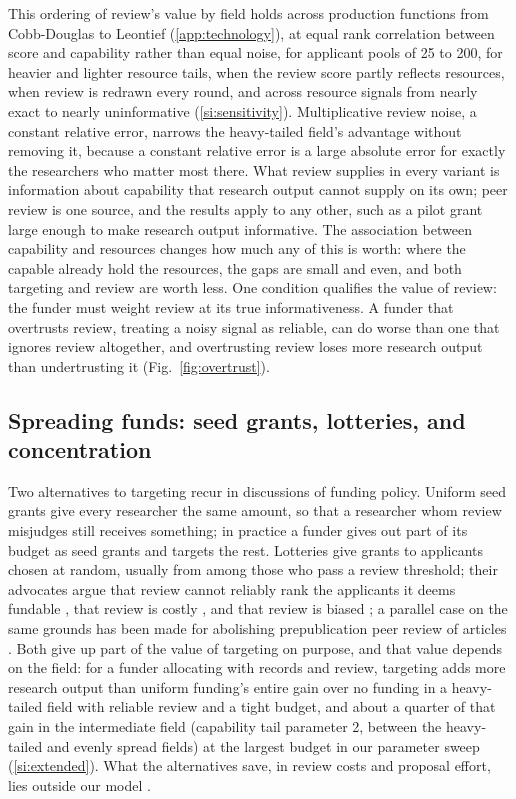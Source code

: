 \documentclass[article, 11pt, reqno]{amsart}
\theoremstyle{named}
\begin{document}
This ordering of review's value by field holds across production functions from Cobb-Douglas to Leontief (\ref{app:technology}), at equal rank correlation between score and capability rather than equal noise, for applicant pools of 25 to 200, for heavier and lighter resource tails, when the review score partly reflects resources, when review is redrawn every round, and across resource signals from nearly exact to nearly uninformative (\ref{si:sensitivity}). Multiplicative review noise, a constant relative error, narrows the heavy-tailed field's advantage without removing it, because a constant relative error is a large absolute error for exactly the researchers who matter most there. What review supplies in every variant is information about capability that research output cannot supply on its own; peer review is one source, and the results apply to any other, such as a pilot grant large enough to make research output informative. The association between capability and resources changes how much any of this is worth: where the capable already hold the resources, the gaps are small and even, and both targeting and review are worth less. One condition qualifies the value of review: the funder must weight review at its true informativeness. A funder that overtrusts review, treating a noisy signal as reliable, can do worse than one that ignores review altogether, and overtrusting review loses more research output than undertrusting it (Fig.~\ref{fig:overtrust}).



\subsection*{Spreading funds: seed grants, lotteries, and concentration}
Two alternatives to targeting recur in discussions of funding policy. Uniform seed grants give every researcher the same amount, so that a researcher whom review misjudges still receives something; in practice a funder gives out part of its budget as seed grants and targets the rest. Lotteries give grants to applicants chosen at random, usually from among those who pass a review threshold; their advocates argue that review cannot reliably rank the applicants it deems fundable \citep{Pier2018, Shaw2023}, that review is costly \citep{Herbert2013, GrossBergstrom2019}, and that review is biased \citep{Ginther2011, Witteman2019, Boudreau2016, FangCasadevall2016, Avin2019, Roumbanis2019}; a parallel case on the same grounds has been made for abolishing prepublication peer review of articles \citep{HeesenBright2021}. Both give up part of the value of targeting on purpose, and that value depends on the field: for a funder allocating with records and review, targeting adds more research output than uniform funding's entire gain over no funding in a heavy-tailed field with reliable review and a tight budget, and about a quarter of that gain in the intermediate field (capability tail parameter 2, between the heavy-tailed and evenly spread fields) at the largest budget in our parameter sweep (\ref{si:extended}). What the alternatives save, in review costs and proposal effort, lies outside our model \citep{GrossBergstrom2019}.
\end{document}
